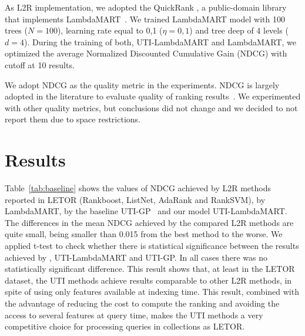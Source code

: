 \documentclass[preprint,review,10pt,3p]{elsarticle}
\begin{document}
As L2R implementation,  we adopted the QuickRank \cite{capannini2016quality}, a public-domain library that implements LambdaMART~\cite{wu2010lambdamart}. We trained LambdaMART model with 100 trees ($N=100$), learning rate equal to 0,1 ($\eta=0,1$) and tree deep of 4 levels ($d=4$). During the training of both, UTI-LambdaMART and LambdaMART, we optimized the average Normalized Discounted Cumulative Gain (NDCG) with cutoff at 10 results.
 
 We adopt NDCG as the quality metric in the experiments. NDCG is  largely adopted in the literature to evaluate quality of ranking results~\cite{baezaribeiro2011modinforet}. We experimented with other quality metrics, but conclusions did not change and we decided to not report them due to space restrictions. 

\section{Results}
\label{results}

Table~\ref{tab:baseline} shows the values of NDCG achieved by L2R
methods reported in LETOR (Rankboost, ListNet, AdaRank and RankSVM),
by LambdaMART, by the baseline UTI-GP~\cite{costa2012lepref} and our
model UTI-LambdaMART. The differences in the mean NDCG achieved by the
compared L2R methods are quite small, being smaller than 0.015 from
the best method to the worse. We applied t-test to check whether there
is statistical significance between the results achieved by
\lambdamart, UTI-LambdaMART and UTI-GP. In all cases there was no
statistically significant difference. This result shows that, at least
in the LETOR dataset, the UTI methods achieve results comparable
to other L2R methods, in spite of using only features available at
indexing time. This result, combined with the advantage of reducing
the cost to compute the ranking and avoiding the access to several
features at query time, makes the UTI methods a very competitive
choice for processing queries in collections as LETOR.
\end{document}
